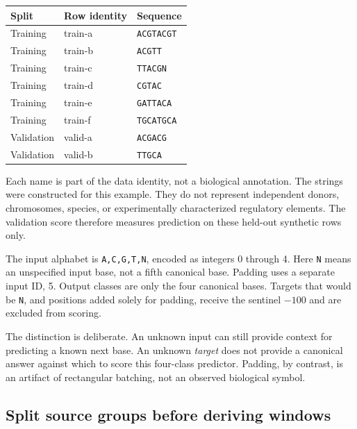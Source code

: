 \begin{center}\small
\begin{tabular}{lll}
\toprule Split & Row identity & Sequence\\\midrule
Training & train-a & \texttt{ACGTACGT}\\
Training & train-b & \texttt{ACGTT}\\
Training & train-c & \texttt{TTACGN}\\
Training & train-d & \texttt{CGTAC}\\
Training & train-e & \texttt{GATTACA}\\
Training & train-f & \texttt{TGCATGCA}\\\midrule
Validation & valid-a & \texttt{ACGACG}\\
Validation & valid-b & \texttt{TTGCA}\\\bottomrule
\end{tabular}
\end{center}

Each name is part of the data identity, not a biological annotation. The strings were constructed for this example. They do not represent independent donors, chromosomes, species, or experimentally characterized regulatory elements. The validation score therefore measures prediction on these held-out synthetic rows only.

The input alphabet is \texttt{A,C,G,T,N}, encoded as integers 0 through 4. Here \texttt{N} means an unspecified input base, not a fifth canonical base. Padding uses a separate input ID, 5. Output classes are only the four canonical bases. Targets that would be \texttt{N}, and positions added solely for padding, receive the sentinel $-100$ and are excluded from scoring.

The distinction is deliberate. An unknown input can still provide context for predicting a known next base. An unknown \emph{target} does not provide a canonical answer against which to score this four-class predictor. Padding, by contrast, is an artifact of rectangular batching, not an observed biological symbol.

\subsection{Split source groups before deriving windows}


